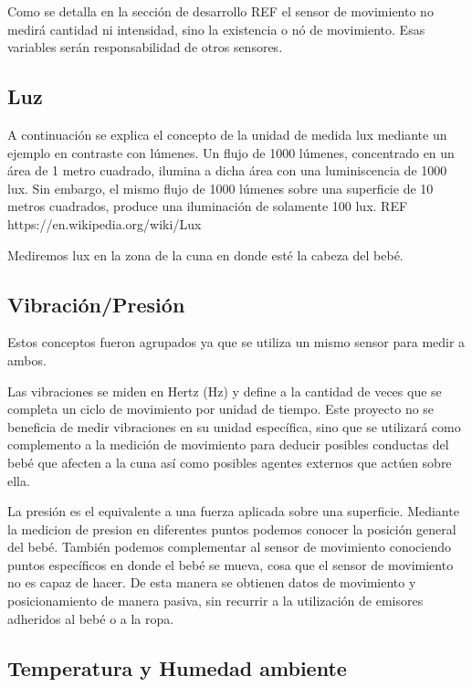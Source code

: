 \documentclass{IEEEtran}
\begin{document}
			Como se detalla en la sección de desarrollo REF el sensor de movimiento no medirá cantidad ni intensidad, sino la existencia o nó de movimiento. Esas variables serán responsabilidad de otros sensores.

		\subsection{Luz}

			A continuación se explica el concepto de la unidad de medida lux mediante un ejemplo en contraste con lúmenes. Un flujo de 1000 lúmenes, concentrado en un área de 1 metro cuadrado, ilumina a dicha área con una luminiscencia de 1000 lux. Sin embargo, el mismo flujo de 1000 lúmenes sobre una superficie de 10 metros cuadrados, produce una iluminación de solamente 100 lux. REF https://en.wikipedia.org/wiki/Lux

			Mediremos lux en la zona de la cuna en donde esté la cabeza del bebé.

		\subsection{Vibración/Presión}

			Estos conceptos fueron agrupados ya que se utiliza un mismo sensor para medir a ambos.

			Las vibraciones se miden en Hertz (Hz) y define a la cantidad de veces que se completa un ciclo de movimiento por unidad de tiempo. Este proyecto no se beneficia de medir vibraciones en su unidad específica, sino que se utilizará como complemento a la medición de movimiento para deducir posibles conductas del bebé que afecten a la cuna así como posibles agentes externos que actúen sobre ella.

			La presión es el equivalente a una fuerza aplicada sobre una superficie. Mediante la medicion de presion en diferentes puntos podemos conocer la posición general del bebé. También podemos complementar al sensor de movimiento conociendo puntos específicos en donde el bebé se mueva, cosa que el sensor de movimiento no es capaz de hacer. De esta manera se obtienen datos de movimiento y posicionamiento de manera pasiva, sin recurrir a la utilización de emisores adheridos al bebé o a la ropa.

		\subsection{Temperatura y Humedad ambiente}
\end{document}
